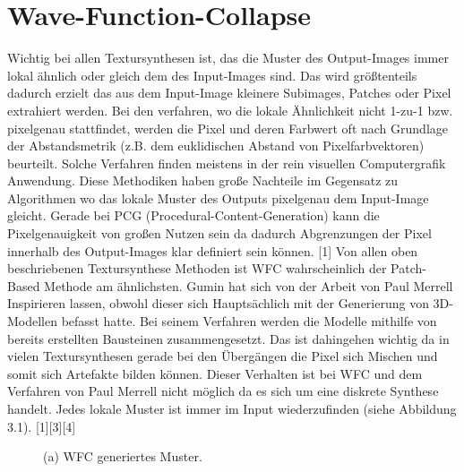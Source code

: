 \documentclass[12pt, a4paper,twoside,openright]{report}
\begin{document}
\chapter{Wave-Function-Collapse}

Wichtig bei allen Textursynthesen ist,
das die Muster des Output-Images immer lokal ähnlich oder gleich dem des Input-Images sind.
Das wird größtenteils dadurch erzielt das aus dem Input-Image kleinere Subimages, Patches oder Pixel extrahiert werden.
Bei den verfahren, wo die lokale Ähnlichkeit nicht 1-zu-1 bzw. pixelgenau stattfindet, werden die Pixel und deren Farbwert oft nach Grundlage der Abstandsmetrik {(z.B. dem euklidischen Abstand von Pixelfarbvektoren)} beurteilt.
Solche Verfahren finden meistens in der rein visuellen Computergrafik Anwendung.
Diese Methodiken haben große Nachteile im Gegensatz zu Algorithmen wo das lokale Muster des Outputs pixelgenau dem Input-Image gleicht.
Gerade bei PCG {(Procedural-Content-Generation)} kann die Pixelgenauigkeit von großen Nutzen sein da dadurch Abgrenzungen der Pixel innerhalb des Output-Images klar definiert sein können. {[1]}
Von allen oben beschriebenen Textursynthese Methoden ist WFC wahrscheinlich der Patch-Based Methode am ähnlichsten.
\newline
Gumin hat sich von der Arbeit von Paul Merrell Inspirieren lassen, obwohl dieser sich Hauptsächlich mit der Generierung von 3D-Modellen befasst hatte.
Bei seinem Verfahren werden die Modelle mithilfe von bereits erstellten Bausteinen zusammengesetzt.
Das ist dahingehen wichtig da in vielen Textursynthesen gerade bei den Übergängen die Pixel sich Mischen und somit sich Artefakte bilden können.
Dieser Verhalten ist bei WFC und dem Verfahren von Paul Merrell nicht möglich da es sich um eine diskrete Synthese handelt.
Jedes lokale Muster ist immer im Input wiederzufinden {(siehe Abbildung 3.1)}. {[1][3][4]}

\begin{figure}[H]
    \centering
    \caption{(a) WFC generiertes Muster.}%
\end{figure}
\end{document}
